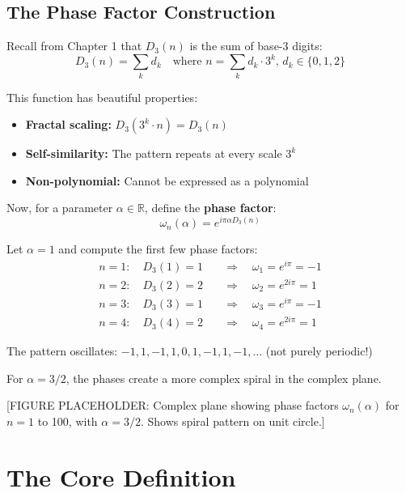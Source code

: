 \subsection{The Phase Factor Construction}

Recall from Chapter 1 that $D_3(n)$ is the sum of base-3 digits:
\begin{equation}
D_3(n) = \sum_{k} d_k \quad \text{where } n = \sum_{k} d_k \cdot 3^k, \, d_k \in \{0,1,2\}
\end{equation}

This function has beautiful properties:
\begin{itemize}
\item \textbf{Fractal scaling:} $D_3(3^k \cdot n) = D_3(n)$
\item \textbf{Self-similarity:} The pattern repeats at every scale $3^k$
\item \textbf{Non-polynomial:} Cannot be expressed as a polynomial
\end{itemize}

Now, for a parameter $\alpha \in \mathbb{R}$, define the \textbf{phase factor}:
\begin{equation}
\omega_n(\alpha) = e^{i\pi\alpha D_3(n)}
\end{equation}

\begin{example}
Let $\alpha = 1$ and compute the first few phase factors:
\begin{align}
n=1: \quad D_3(1) = 1 \quad &\Rightarrow \quad \omega_1 = e^{i\pi} = -1 \\
n=2: \quad D_3(2) = 2 \quad &\Rightarrow \quad \omega_2 = e^{2i\pi} = 1 \\
n=3: \quad D_3(3) = 1 \quad &\Rightarrow \quad \omega_3 = e^{i\pi} = -1 \\
n=4: \quad D_3(4) = 2 \quad &\Rightarrow \quad \omega_4 = e^{2i\pi} = 1
\end{align}

The pattern oscillates: $-1, 1, -1, 1, 0, 1, -1, 1, -1, \ldots$ (not purely periodic!)

For $\alpha = 3/2$, the phases create a more complex spiral in the complex plane.
\end{example}

[FIGURE PLACEHOLDER: Complex plane showing phase factors $\omega_n(\alpha)$ for $n=1$ to 100, with $\alpha = 3/2$. Shows spiral pattern on unit circle.]

\section{The Core Definition}
\label{sec:definition}

